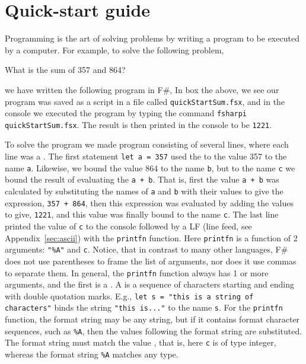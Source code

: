 \chapter{Quick-start guide}
Programming is the art of solving problems by writing a program to be executed by a computer. For example, to solve the following problem,
\begin{problem}
  What is the sum of 357 and 864?
\end{problem}
we have written the following program in F\#,
%
%
In box the above, we see our program was saved as a script in a file called \texttt{quickStartSum.fsx}, and in the console we executed the program by typing the command \lstinline|fsharpi quickStartSum.fsx|. The result is then printed in the console to be \texttt{1221}.

To solve the program we made program consisting of several lines, where each line was a . The first statement \lstinline|let a = 357| used the   to  the value 357 to the name \lstinline|a|. Likewise, we bound the value 864 to the name \lstinline|b|, but to the name \lstinline|c| we bound the result of evaluating the  \lstinline|a + b|. That is, first the value \lstinline|a + b| was calculated by substituting the names of \lstinline|a| and \lstinline|b| with their values to give the expression, \lstinline|357 + 864|, then this expression was evaluated by adding the values to give, \lstinline|1221|, and this value was finally bound to the name \lstinline|c|. The last line printed the value of \lstinline|c| to the console followed by a LF (line feed, see Appendix~\ref{sec:ascii}) with the \lstinline|printfn| function. Here \lstinline|printfn| is a function of 2 arguments: \lstinline|"%A"| and \lstinline|c|. Notice, that in contrast to many other languages, F\# does not use parentheses to frame the list of arguments, nor does it use commas to separate them. In general, the \lstinline|printfn| function always has 1 or more arguments, and the first is a . A  is a sequence of characters starting and ending with double quotation marks. E.g.,  \lstinline|let s = "this is a string of characters"| binds the string \lstinline|"this is..."| to the name \lstinline|s|. For the \lstinline|printfn| function, the format string may be any string, but if it contains format character sequences, such as \lstinline|%A|, then the values following the format string are substituted. The format string must match the value , that is, here \lstinline|c| is of type integer, whereas the format string \lstinline|%A| matches any type.

